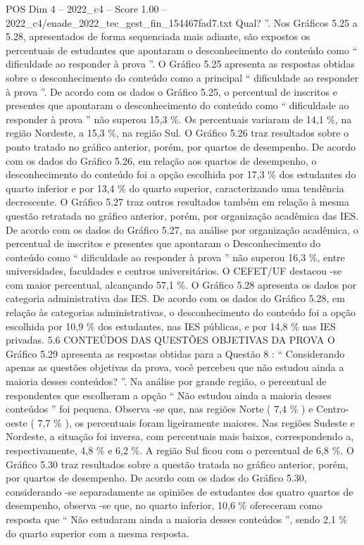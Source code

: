 \begin{textsample}{POS Dim 4 – 2022\_c4 – Score 1.00 – 2022\_c4/enade\_2022\_tec\_gest\_fin\_154467fad7.txt}
Qual? ”.
Nos Gráficos 5.25 a 5.28, apresentados de forma sequenciada mais adiante, são expostos os percentuais de estudantes que apontaram o desconhecimento do conteúdo como “ dificuldade ao responder à prova ”.
O Gráfico 5.25 apresenta as respostas obtidas sobre o desconhecimento do conteúdo como a principal “ dificuldade ao responder à prova ”.
De acordo com os dados o Gráfico 5.25, o percentual de inscritos e presentes que apontaram o desconhecimento do conteúdo como “ dificuldade ao responder à prova ” não superou 15,3 \%.
Os percentuais variaram de 14,1 \%, na região Nordeste, a 15,3 \%, na região Sul.
O Gráfico 5.26 traz resultados sobre o ponto tratado no gráfico anterior, porém, por quartos de desempenho.
De acordo com os dados do Gráfico 5.26, em relação aos quartos de desempenho, o desconhecimento do conteúdo foi a opção escolhida por 17,3 \% dos estudantes do quarto inferior e por 13,4 \% do quarto superior, caracterizando uma tendência decrescente.
O Gráfico 5.27 traz outros resultados também em relação à mesma questão retratada no gráfico anterior, porém, por organização acadêmica das IES.
De acordo com os dados do Gráfico 5.27, na análise por organização acadêmica, o percentual de inscritos e presentes que apontaram o Desconhecimento do conteúdo como “ dificuldade ao responder à prova ” não superou 16,3 \%, entre universidades, faculdades e centros universitários.
O CEFET/UF destacou -se com maior percentual, alcançando 57,1 \%.
O Gráfico 5.28 apresenta os dados por categoria administrativa das IES.
De acordo com os dados do Gráfico 5.28, em relação às categorias administrativas, o desconhecimento do conteúdo foi a opção escolhida por 10,9 \% dos estudantes, nas IES públicas, e por 14,8 \% nas IES privadas. 5.6 CONTEÚDOS DAS QUESTÕES OBJETIVAS DA PROVA O Gráfico 5.29 apresenta as respostas obtidas para a Questão 8 : “ Considerando apenas as questões objetivas da prova, você percebeu que não estudou ainda a maioria desses conteúdos? ”.
Na análise por grande região, o percentual de respondentes que escolheram a opção “ Não estudou ainda a maioria desses conteúdos ” foi pequena.
Observa -se que, nas regiões Norte ( 7,4 \% ) e Centro-oeste ( 7,7 \% ), os percentuais foram ligeiramente maiores.
Nas regiões Sudeste e Nordeste, a situação foi inversa, com percentuais mais baixos, correspondendo a, respectivamente, 4,8 \% e 6,2 \%.
A região Sul ficou com o percentual de 6,8 \%.
O Gráfico 5.30 traz resultados sobre a questão tratada no gráfico anterior, porém, por quartos de desempenho.
De acordo com os dados do Gráfico 5.30, considerando -se separadamente as opiniões de estudantes dos quatro quartos de desempenho, observa -se que, no quarto inferior, 10,6 \% ofereceram como resposta que “ Não estudaram ainda a maioria desses conteúdos ”, sendo 2,1 \% do quarto superior com a mesma resposta.

\end{textsample}
